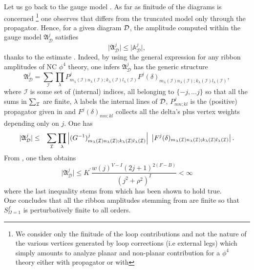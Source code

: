 \documentclass[10pt]{book}
\theoremstyle{break}
\begin{document}
Let us go back to the gauge model %
. As far as finitude of the diagrams is concerned%
{\footnote{We consider only the finitude of the loop contributions and not the nature of the various vertices generated by loop corrections (i.e external legs) which simply amounts to analyze planar and non-planar contribution for a $\phi^4$ theory either with propagator %
or with %
}}
one observes that %
differs from the truncated model only through the propagator. Hence, for a given diagram ${\cal{D}}$, the amplitude computed within the gauge model %
$\mathfrak{A}^j_{\mathcal{D}}$ satisfies 
\begin{equation*}
\vert \mathfrak{A}^j_{\mathcal{D}}\vert\le \vert \mathbb{A}^j_{\mathcal{D}}\vert,
\end{equation*}
thanks to the estimate %
. Indeed, by using the general expression for any ribbon amplitudes of NC $\phi^4$ theory, one infers $\mathfrak{A}^j_{\mathcal{D}}$ has the generic structure%
%
\begin{equation*}
\mathfrak{A}^j_{\mathcal{D}} = \sum_{\mathcal{I}} \prod_\lambda P^j_{m_\lambda(\mathcal{I}) n_\lambda(\mathcal{I});k_\lambda(\mathcal{I}) l_\lambda(\mathcal{I})} F^j(\delta)_{m_\lambda(\mathcal{I}) n_\lambda(\mathcal{I});k_\lambda(\mathcal{I}) l_\lambda(\mathcal{I})},%
\end{equation*}
%
where $\mathcal{I}$ is some set of (internal) indices, all belonging to $\{-j,...j\}$ so that all the sums in $\sum_{{\cal{I}}}$ are finite, $\lambda$ labels the internal lines of ${\cal{D}}$, $P^j_{mn;kl}$ is the (positive) propagator given in %
and $F^j(\delta)_{mn;kl}$ collects all the delta's plus vertex weights depending only on $j$. One has%
%
\begin{eqnarray*}
\vert\mathfrak{A}^j_{\mathcal{D}}\vert &\le& \sum_{\mathcal{I}} \prod_\lambda \left|(G^{-1})^j_{m_\lambda(\mathcal{I}) n_\lambda(\mathcal{I}) ; k_\lambda(\mathcal{I}) l_\lambda(\mathcal{I})} \right| \ \left| F^j(\delta)_{m_\lambda({\cal{I}}) n_\lambda({\cal{I}});k_\lambda({\cal{I}}) l_\lambda({\cal{I}})} \right|.
\end{eqnarray*}
%
From %
, one then obtains
\begin{equation*}
\vert\mathfrak{A}^j_{\mathcal{D}}\vert \le K^\prime\frac{w(j)^{V-I}(2j+1)^{2(F-B)}}{(j^2+\rho^2)^I}< \infty
\end{equation*}
where the last inequality stems from %
which has been shown to hold true.\\
One concludes that all the ribbon amplitudes stemming from %
are finite so that $S^f_{\Omega=1}$ is perturbatively finite to all orders.\par%
\end{document}
